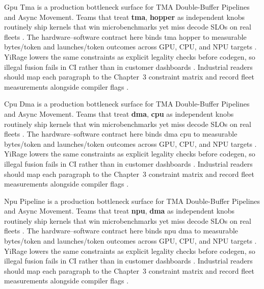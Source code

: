 Gpu Tma is a production bottleneck surface for TMA Double-Buffer Pipelines and Async Movement. Teams that treat \textbf{tma}, \textbf{hopper} as independent knobs routinely ship kernels that win microbenchmarks yet miss decode SLOs on real fleets \citep{nvidia2024cudagraphs,taxbreak2026}. The hardware--software contract here binds tma hopper to measurable bytes/token and launches/token outcomes across GPU, CPU, and NPU targets \citep{liu2024deepseekv3,memoryfloor2026}. YiRage lowers the same constraints as explicit legality checks before codegen, so illegal fusion fails in CI rather than in customer dashboards \citep{patel2025llminference,nvidia2022hopper}. Industrial readers should map each paragraph to the Chapter~3 constraint matrix and record fleet measurements alongside compiler flags \citep{taxbreak2026,semianalysis2024tma}.

Cpu Dma is a production bottleneck surface for TMA Double-Buffer Pipelines and Async Movement. Teams that treat \textbf{dma}, \textbf{cpu} as independent knobs routinely ship kernels that win microbenchmarks yet miss decode SLOs on real fleets \citep{liu2024deepseekv3,memoryfloor2026}. The hardware--software contract here binds dma cpu to measurable bytes/token and launches/token outcomes across GPU, CPU, and NPU targets \citep{patel2025llminference,nvidia2022hopper}. YiRage lowers the same constraints as explicit legality checks before codegen, so illegal fusion fails in CI rather than in customer dashboards \citep{taxbreak2026,semianalysis2024tma}. Industrial readers should map each paragraph to the Chapter~3 constraint matrix and record fleet measurements alongside compiler flags \citep{memoryfloor2026,amd2024xdna}.

Npu Pipeline is a production bottleneck surface for TMA Double-Buffer Pipelines and Async Movement. Teams that treat \textbf{npu}, \textbf{dma} as independent knobs routinely ship kernels that win microbenchmarks yet miss decode SLOs on real fleets \citep{patel2025llminference,nvidia2022hopper}. The hardware--software contract here binds npu dma to measurable bytes/token and launches/token outcomes across GPU, CPU, and NPU targets \citep{taxbreak2026,semianalysis2024tma}. YiRage lowers the same constraints as explicit legality checks before codegen, so illegal fusion fails in CI rather than in customer dashboards \citep{memoryfloor2026,amd2024xdna}. Industrial readers should map each paragraph to the Chapter~3 constraint matrix and record fleet measurements alongside compiler flags \citep{nvidia2022hopper,amd2024aie}.

